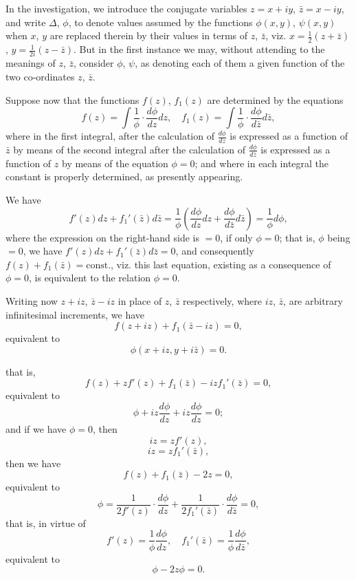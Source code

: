 \documentclass[11pt,a4paper]{article}
\begin{document}
In the investigation, we introduce the conjugate variables $z = x + iy$, $\bar{z} = x - iy$, and write $\Delta$, $\phi$, to denote values assumed by the functions $\phi(x, y)$, $\psi(x, y)$ when $x$, $y$ are replaced therein by their values in terms of $z$, $\bar{z}$, viz. $x = \frac{1}{2}(z + \bar{z})$, $y = \frac{1}{2i}(z - \bar{z})$. But in the first instance we may, without attending to the meanings of $z$, $\bar{z}$, consider $\phi$, $\psi$, as denoting each of them a given function of the two co-ordinates $z$, $\bar{z}$.

Suppose now that the functions $f(z)$, $f_1(z)$ are determined by the equations
\[
f(z) = \int \frac{1}{\phi} \cdot \frac{d\phi}{dz}dz, \quad f_1(z) = \int \frac{1}{\phi} \cdot \frac{d\phi}{d\bar{z}}d\bar{z},
\]
where in the first integral, after the calculation of $\frac{d\phi}{dz}$ is expressed as a function of $\bar{z}$ by means of the second integral after the calculation of $\frac{d\phi}{d\bar{z}}$ is expressed as a function of $z$ by means of the equation $\phi = 0$; and where in each integral the constant is properly determined, as presently appearing.

We have
\[
f'(z) dz + f_1'(\bar{z}) d \bar{z} = \frac{1}{\phi} \left( \frac{d \phi}{d z} dz + \frac{d \phi}{d \bar{z}} d \bar{z} \right) = \frac{1}{\phi} d \phi,
\]
where the expression on the right-hand side is $= 0$, if only $\phi = 0$; that is, $\phi$ being $= 0$, we have $f'(z) dz + f_1'(\bar{z}) d \bar{z} = 0$, and consequently $f(z) + f_1(\bar{z}) = \text{const.}$, viz. this last equation, existing as a consequence of $\phi = 0$, is equivalent to the relation $\phi = 0$.

Writing now $z + iz$, $\bar{z} - iz$ in place of $z$, $\bar{z}$ respectively, where $iz$, $\bar{z}$, are arbitrary infinitesimal increments, we have
\[
f(z + iz) + f_1(\bar{z} - iz) = 0,
\]
equivalent to
\[
\phi (x + i z, y + i\bar{z}) = 0.
\]

that is,
\[
f(z) + zf'(z) + f_1(\bar{z}) - i z f_1'(\bar{z}) = 0,
\]
equivalent to
\[
\phi + i z \frac{d\phi}{dz} + i z \frac{d \phi}{dz} = 0;
\]
and if we have $\phi = 0$, then
\[
i z = z f'(z),
\]
\[
i z = z f_1'(\bar{z}),
\]
then we have
\[
f(z) + f_1(\bar{z}) - 2z = 0,
\]
equivalent to
\[
\phi = \frac{1}{2 f'(z)} \cdot \frac{d \phi}{dz} + \frac{1}{2 f_1'(\bar{z})} \cdot \frac{d \phi}{d \bar{z}} = 0,
\]
that is, in virtue of
\[
f'(z) = \frac{1}{\phi} \frac{d \phi}{d z}, \quad f_1'(\bar{z}) = \frac{1}{\phi} \frac{d \phi}{d \bar{z}},
\]
equivalent to
\[
\phi - 2 z \phi = 0.
\]
\end{document}
